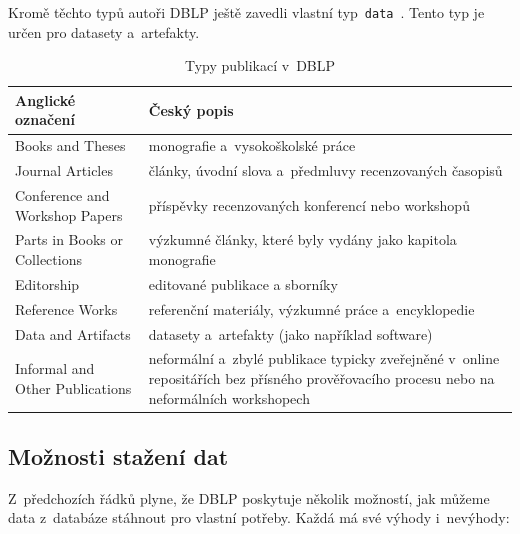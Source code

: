 \documentclass[
  biblatex,
  sourcecodes,
  glossaries,
  index
]{kidiplom}
\begin{document}

Kromě těchto typů autoři DBLP ještě zavedli vlastní typ~\texttt{data}~\cite{t11}. Tento typ je určen pro datasety a~artefakty.



\begin{table}[h]
\begin{center}
\caption{Typy publikací v~DBLP}\label{tab:typy_publikaci}
\begin{tabular}{|L{4cm}|L{9cm}|}
\hline
\textbf{Anglické označení} & \textbf{Český popis} \\
\hline
Books and Theses & monografie a~vysokoškolské práce \\
\hline
Journal Articles & články, úvodní slova a~předmluvy recenzovaných časopisů \\
\hline
Conference and Workshop Papers & příspěvky recenzovaných konferencí nebo workshopů \\
\hline
Parts in Books or Collections & výzkumné články, které byly vydány jako kapitola monografie \\
\hline
Editorship & editované publikace a sborníky \\
\hline
Reference Works & referenční materiály, výzkumné práce a~encyklopedie \\
\hline
Data and Artifacts & datasety a~artefakty (jako například software) \\
\hline
Informal and Other Publications & neformální a~zbylé publikace typicky zveřejněné v~online repositářích bez přísného prověřovacího procesu nebo na neformálních workshopech \\
\hline
\end{tabular}
\end{center}
\end{table}


\subsection{Možnosti stažení dat} \label{sec:moznosti_stazeni_dat}

Z~předchozích řádků plyne, že DBLP poskytuje několik možností, jak můžeme data z~databáze stáhnout pro vlastní potřeby. Každá má své výhody i~nevýhody:
\end{document}
